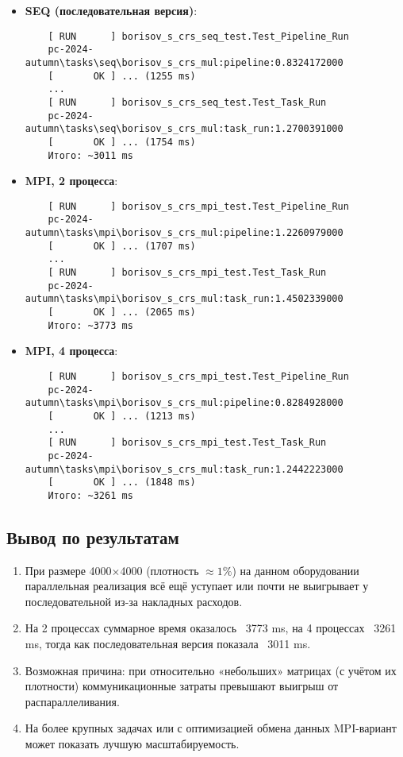 \documentclass[12pt]{article}
\begin{document}
\begin{itemize}
    \item \textbf{SEQ (последовательная версия)}: 
    \begin{verbatim}
    [ RUN      ] borisov_s_crs_seq_test.Test_Pipeline_Run
    pc-2024-autumn\tasks\seq\borisov_s_crs_mul:pipeline:0.8324172000
    [       OK ] ... (1255 ms)
    ...
    [ RUN      ] borisov_s_crs_seq_test.Test_Task_Run
    pc-2024-autumn\tasks\seq\borisov_s_crs_mul:task_run:1.2700391000
    [       OK ] ... (1754 ms)
    Итого: ~3011 ms
    \end{verbatim}

    \item \textbf{MPI, 2 процесса}:
    \begin{verbatim}
    [ RUN      ] borisov_s_crs_mpi_test.Test_Pipeline_Run
    pc-2024-autumn\tasks\mpi\borisov_s_crs_mul:pipeline:1.2260979000
    [       OK ] ... (1707 ms)
    ...
    [ RUN      ] borisov_s_crs_mpi_test.Test_Task_Run
    pc-2024-autumn\tasks\mpi\borisov_s_crs_mul:task_run:1.4502339000
    [       OK ] ... (2065 ms)
    Итого: ~3773 ms
    \end{verbatim}

    \item \textbf{MPI, 4 процесса}:
    \begin{verbatim}
    [ RUN      ] borisov_s_crs_mpi_test.Test_Pipeline_Run
    pc-2024-autumn\tasks\mpi\borisov_s_crs_mul:pipeline:0.8284928000
    [       OK ] ... (1213 ms)
    ...
    [ RUN      ] borisov_s_crs_mpi_test.Test_Task_Run
    pc-2024-autumn\tasks\mpi\borisov_s_crs_mul:task_run:1.2442223000
    [       OK ] ... (1848 ms)
    Итого: ~3261 ms
    \end{verbatim}
\end{itemize}

\subsection{Вывод по результатам}
\begin{enumerate}
    \item При размере 4000$\times$4000 (плотность $\approx 1\%$) на данном оборудовании параллельная реализация всё ещё уступает или почти не выигрывает у последовательной из-за накладных расходов.
    \item На 2 процессах суммарное время оказалось ~3773 ms, на 4 процессах ~3261 ms, тогда как последовательная версия показала ~3011 ms.
    \item Возможная причина: при относительно «небольших» матрицах (с учётом их плотности) коммуникационные затраты превышают выигрыш от распараллеливания.
    \item На более крупных задачах или с оптимизацией обмена данных MPI-вариант может показать лучшую масштабируемость.
\end{enumerate}
\end{document}
